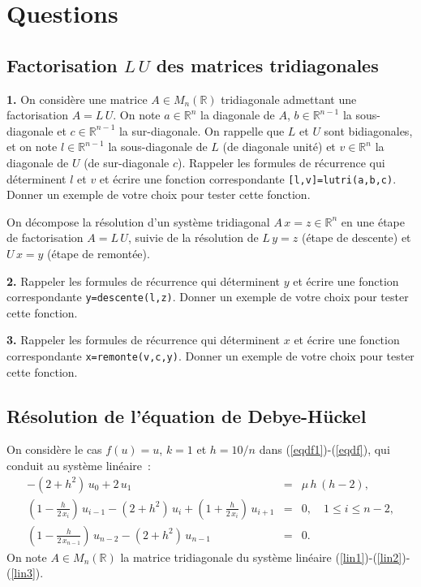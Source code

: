 \documentclass[a4paper,10pt]{article}
\begin{document}
\section{Questions}

\subsection{\label{factlu}Factorisation $L\, U$ des matrices tridiagonales}

\noindent
{\bf 1.} On consid\`ere une matrice $A \in M_n (\mathbb{R})$ tridiagonale admettant une factorisation $A = L\, U$.
On note $a \in \mathbb{R}^n$ la diagonale de $A$, $b \in \mathbb{R}^{n-1}$ la sous-diagonale et
$c \in \mathbb{R}^{n-1}$ la sur-diagonale. On rappelle que $L$ et $U$ sont bidiagonales, et on note
$l \in \mathbb{R}^{n-1}$ la sous-diagonale de $L$ (de diagonale unit\'e)
et $v \in \mathbb{R}^n$ la diagonale de $U$ (de sur-diagonale $c$). 
Rappeler les formules de r\'ecurrence qui d\'eterminent $l$ et $v$ et
\'ecrire une fonction correspondante \verb+[l,v]=lutri(a,b,c)+. 
Donner un exemple de votre choix pour tester cette fonction.

\vspace{1ex}

On d\'ecompose la r\'esolution d'un syst\`eme tridiagonal $A\, x=z \in \mathbb{R}^n$ en une \'etape de factorisation 
$A = L\, U$, suivie de la r\'esolution de $L\, y=z$ (\'etape de descente) et $U\, x=y$ (\'etape de remont\'ee).

\vspace{1ex}

\noindent
{\bf 2.} 
Rappeler les formules de r\'ecurrence qui d\'eterminent $y$ et
\'ecrire une fonction correspondante \verb+y=descente(l,z)+. 
Donner un exemple de votre choix pour tester cette fonction.

\vspace{1ex}

\noindent
{\bf 3.} 
Rappeler les formules de r\'ecurrence qui d\'eterminent $x$ et
\'ecrire une fonction correspondante \verb+x=remonte(v,c,y)+. 
Donner un exemple de votre choix pour tester cette fonction.

\subsection{\label{mod1}R\'esolution de l'\'equation de Debye-H\"uckel}

On consid\`ere le cas $f(u)=u$, $k=1$ et $h=10/n$
dans (\ref{eqdf1})-(\ref{eqdf}), qui conduit au syst\`eme lin\'eaire~:
\begin{eqnarray}
\label{lin1}
-(2+h^2)\, u_0 + 2\, u_1 
&=&  \mu\, h\, (h-2) , \\
\label{lin2}
(1- \frac{h}{2\, x_i})\, u_{i-1}
-(2+h^2)\, u_i
+ (1+\frac{h}{2\, x_i})\, u_{i+1}&=&0, 
\quad 1 \leq i \leq n-2 ,
\\
\label{lin3}
(1- \frac{h}{2\, x_{n-1}})\, u_{n-2}
-(2+h^2)\, u_{n-1}
&=&0.
\end{eqnarray}
On note $A \in M_n (\mathbb{R})$ la matrice tridiagonale du syst\`eme lin\'eaire
(\ref{lin1})-(\ref{lin2})-(\ref{lin3}).
\end{document}
